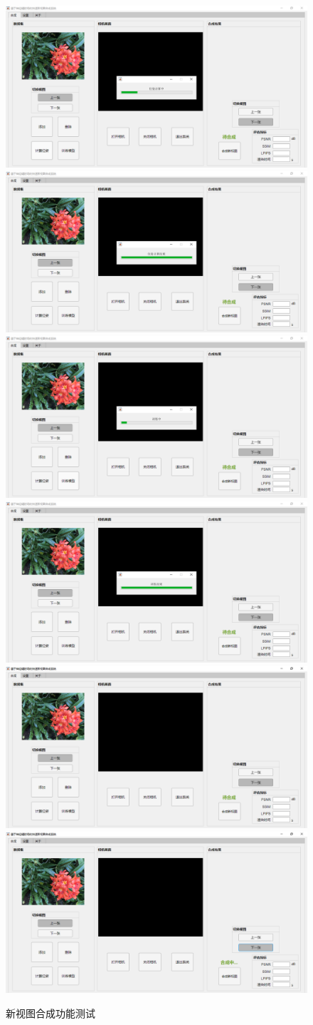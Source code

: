 \begin{figure}[bhtp]
	\centering
	{\includegraphics[width=0.45\linewidth]{figures/system/3-a.png}}
	{\includegraphics[width=0.45\linewidth]{figures/system/3-b.png}}
	{\includegraphics[width=0.45\linewidth]{figures/system/3-c.png}}
	{\includegraphics[width=0.45\linewidth]{figures/system/3-d.png}}
	{\includegraphics[width=0.45\linewidth]{figures/system/3-e.png}}
	{\includegraphics[width=0.45\linewidth]{figures/system/3-f.png}}
	\caption{新视图合成功能测试}
\end{figure}
